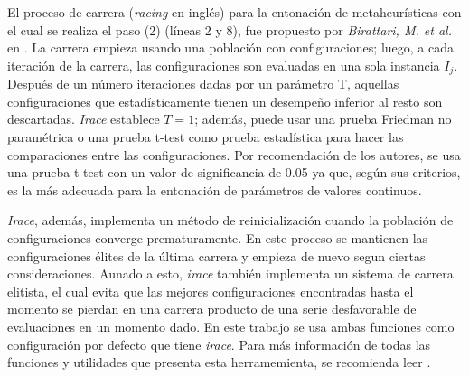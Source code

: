 El proceso de carrera (\emph{racing} en inglés) para la entonación de metaheurísticas con el cual se realiza el paso (2) (líneas 2 y 8), fue propuesto por \emph{Birattari, M. et al.} en \cite{birattari2002racing}. La carrera empieza usando una población con configuraciones; luego, a cada iteración de la carrera, las configuraciones son evaluadas en una sola instancia $I_j$. Después de un número iteraciones dadas por un parámetro T, aquellas configuraciones que estadísticamente tienen un desempeño inferior al resto son descartadas. \emph{Irace} establece  $T = 1$; además, puede usar una prueba Friedman no paramétrica o una prueba t-test como prueba estadística para hacer las comparaciones entre las configuraciones. Por recomendación de los autores, se usa una prueba t-test con un valor de significancia de 0.05 ya que, según sus criterios, es la más adecuada para la entonación de parámetros de valores continuos.

\emph{Irace}, además, implementa un método de reinicialización cuando la población de configuraciones converge prematuramente. En este proceso se mantienen las configuraciones élites de la última carrera y empieza de nuevo segun ciertas consideraciones. Aunado a esto, \emph{irace} también implementa un sistema de carrera elitista, el cual evita que las mejores configuraciones encontradas hasta el momento se pierdan en una carrera producto de una serie desfavorable de evaluaciones en un momento dado. En este trabajo se usa ambas funciones como configuración por defecto que tiene \emph{irace}. Para más información de todas las funciones y utilidades que presenta esta herramemienta, se recomienda leer \cite{lopez2016irace}.
